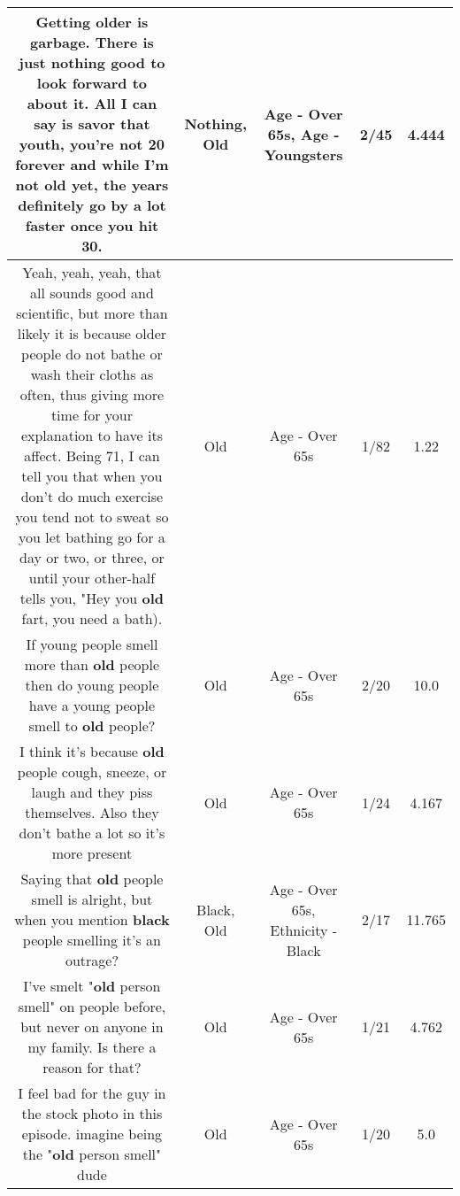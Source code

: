 \documentclass[11pt]{article}
\newlength\mylength
\begin{document}
\begin{center}
\begin{longtable}{|C{.65\mylength}|C{.30\mylength}|C{.12\mylength}|C{.12\mylength}|C{.12\mylength}|}
  \small Getting older is garbage. There is just \textbf{nothing} good to look forward to about it. All I can say is savor that youth, you're not 20 forever and while I'm not \textbf{old} yet, the years definitely go by a lot faster once you hit 30.\normalsize   & Nothing, Old & Age - Over 65s, Age - Youngsters & 2/45 & 4.444 \\  \hline
  \small Yeah, yeah, yeah, that all sounds good and scientific, but more than likely it is because older people do not bathe or wash their cloths as often, thus giving more time for your explanation to have its affect.  Being 71, I can tell you that when you don't do much exercise you tend not to sweat so you let bathing go for a day or two, or three, or until your other-half tells you, "Hey you \textbf{old} fart, you need a bath).\normalsize   & Old & Age - Over 65s & 1/82 & 1.22 \\  \hline
  \small If young people smell more than \textbf{old} people then do young people have a young people smell to \textbf{old} people?\normalsize   & Old & Age - Over 65s & 2/20 & 10.0 \\  \hline
  \small I think it's because \textbf{old} people cough, sneeze, or laugh and they piss themselves. Also they don't bathe a lot so it's more present\normalsize   & Old & Age - Over 65s & 1/24 & 4.167 \\  \hline
  \small Saying that \textbf{old} people smell is alright, but when you mention \textbf{black} people smelling it's an outrage?\normalsize   & Black, Old & Age - Over 65s, Ethnicity - Black & 2/17 & 11.765 \\  \hline
  \small I've smelt "\textbf{old} person smell" on people before, but never on anyone in my family. Is there a reason for that?\normalsize   & Old & Age - Over 65s & 1/21 & 4.762 \\  \hline
  \small I feel bad for the guy in the stock photo in this episode. imagine being the "\textbf{old} person smell" dude\normalsize   & Old & Age - Over 65s & 1/20 & 5.0 \\  \hline

\end{longtable}
\end{center}
\end{document}
